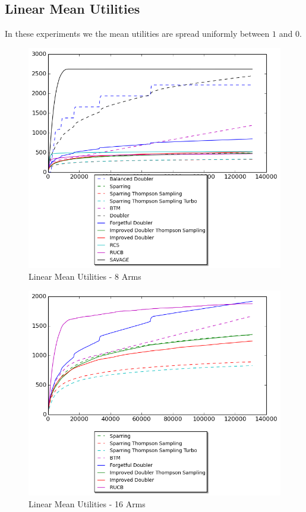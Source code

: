 \documentclass[MSc,beforeExam]{iitcsthesis}
\begin{document}
\subsection{Linear Mean Utilities}
In these experiments we the mean utilities are spread uniformly between $1$ and $0$.
\begin{figure}[h!]
\centering
  \includegraphics[scale=0.8]{graphs/linear_arm_8.png}
  \caption{Linear Mean Utilities - 8 Arms}
\end{figure}
\newpage
\begin{figure}[h!]
\centering
  \includegraphics[scale=0.8]{graphs/linear_arm_16.png}
  \caption{Linear Mean Utilities - 16 Arms}
\end{figure}
\end{document}
